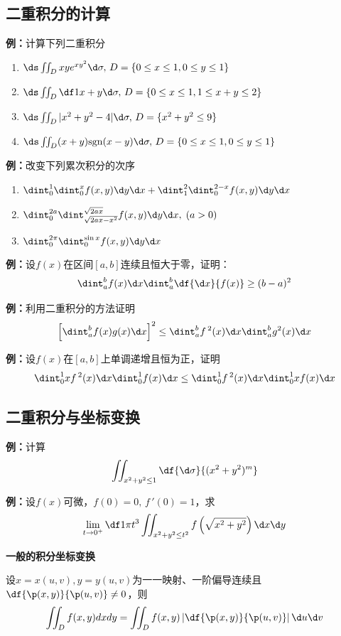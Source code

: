 \subsection{二重积分的计算}

{\bf 例：}计算下列二重积分
\begin{enumerate}[(1)]
  \setlength{\itemindent}{1cm}
  \item $\ds\iint_Dxye^{xy^2}\d\sigma,\,D=\{0\leq x\leq 1,0\leq
  y\leq 1\}$ 
  \item $\ds\iint_D\df 1{x+y}\d\sigma,\,D=\{0\leq x\leq 1,1\leq x+y\leq
  2\}$ 
  \item $\ds\iint_D|x^2+y^2-4|\d\sigma,\,D=\{x^2+y^2\leq 9\}$ 
  \item $\ds\iint_D(x+y)\mathrm{sgn}(x-y)\d\sigma,\,D=\{0\leq x\leq 1,0\leq
  y\leq 1\}$
\end{enumerate}

{\bf 例：}改变下列累次积分的次序
\begin{enumerate}[(1)]
  \setlength{\itemindent}{1cm}
  \item $\dint_0^1\dint_0^xf(x,y)\d
  y\d x+\dint_1^2\dint_0^{2-x}f(x,y)\d y\d x$
  \item $\dint_0^{2a}\dint_{\sqrt{2ax-x^2}}^{\sqrt{2ax}}
  f(x,y)\d y\d x,\;(a>0)$ 
  \item $\dint_0^{2\pi}\dint_0^{\sin x}f(x,y)\d y\d x$
\end{enumerate}

{\bf 例：}设$f(x)$在区间$[a,b]$连续且恒大于零，证明：
$$\dint_a^bf(x)\d x\dint_a^b\df{\d x}{f(x)}\geq (b-a)^2$$

{\bf 例：}利用二重积分的方法证明
$$\left[\dint_a^bf(x)g(x)\d x\right]^2\leq
\dint_a^bf\,^2(x)\d x\dint_a^bg^2(x)\d x$$

{\bf 例：}设$f(x)$在$[a,b]$上单调递增且恒为正，证明
$${\dint_0^1xf\,^2(x)\d x}{\dint_0^1f(x)\d x}\leq
{\dint_0^1f\,^2(x)\d x}{\dint_0^1xf(x)\d x}$$

\subsection{二重积分与坐标变换}

{\bf 例：}计算
$$\iint_{x^2+y^2\leq 1}\df{\d\sigma}{(x^2+y^2)^m}$$

{\bf 例：}设$f(x)$可微，$f(0)=0,\,f\,'(0)=1$，求
$$\lim\limits_{t\to 0^+}\df 1{\pi t^3}
\iint_{x^2+y^2\leq t^2}f\left(
\sqrt{x^2+y^2}\right)\d x\d y$$

{\bf 一般的积分坐标变换}

设$x=x(u,v),y=y(u,v)$为一一映射、一阶偏导连续且$\df{\p(x,y)}{\p(u,v)}\ne0$，则
$$\iint_Df(x,y)dxdy=\iint_D f(x,y)\left|\df{\p(x,y)}{\p(u,v)}\right|
\d u\d v$$


